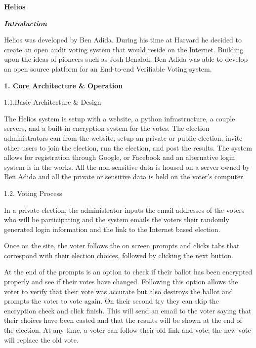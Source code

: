 \bigskip

\textbf{Helios}

\textbf{\textit{Introduction}}

Helios was developed by Ben Adida. During his time at Harvard he decided to create an open audit voting system that would reside on the Internet. Building upon the ideas of pioneers such as Josh Benaloh, Ben Adida was able to develop an open source platform for an End-to-end Verifiable Voting system.

\textbf{1. Core Architecture \& Operation}

1.1.Basic Architecture \& Design

The Helios system is setup with a website, a python infrastructure, a couple servers, and a built-in encryption system for the votes. The election administrators can from the website, setup an private or public election, invite other users to join the election, run the election, and post the results. The system allows for registration through Google, or Facebook and an alternative login system is in the works. All the non-sensitive data is housed on a server owned by Ben Adida and all the private or sensitive data is held on the voter's computer.

\textcolor[rgb]{0.0,0.007843138,0.039215688}{1.2. Voting Process}

In a private election, the administrator inputs the email addresses of the voters who will be participating and the system emails the voters their randomly generated login information and the link to the Internet based election.

Once on the site, the voter follows the on screen prompts and clicks tabs that correspond with their election choices, followed by clicking the next button.

At the end of the prompts is an option to check if their ballot has been encrypted properly and see if their votes have changed. Following this option allows the voter to verify that their vote was accurate but also destroys the ballot and prompts the voter to vote again. On their second try they can skip the encryption check and click finish. This will send an email to the voter saying that their choices have been casted and that the results will be shown at the end of the election. At any time, a voter can follow their old link and vote; the new vote will replace the old vote.


\bigskip



